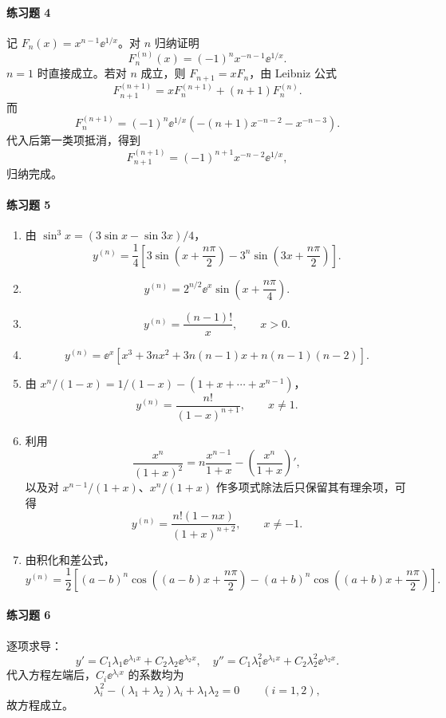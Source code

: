 \paragraph{练习题 4}
\begin{xsolution}
记 $F_n(x)=x^{n-1}\ee^{1/x}$。对 $n$ 归纳证明
\[
  F_n^{(n)}(x)=(-1)^nx^{-n-1}\ee^{1/x}.
\]
$n=1$ 时直接成立。若对 $n$ 成立，则 $F_{n+1}=xF_n$，由 Leibniz 公式
\[
  F_{n+1}^{(n+1)}=xF_n^{(n+1)}+(n+1)F_n^{(n)}.
\]
而
\[
  F_n^{(n+1)}=(-1)^n\ee^{1/x}
  \left(-(n+1)x^{-n-2}-x^{-n-3}\right).
\]
代入后第一类项抵消，得到
\[
  F_{n+1}^{(n+1)}=(-1)^{n+1}x^{-n-2}\ee^{1/x},
\]
归纳完成。
\end{xsolution}

\paragraph{练习题 5}
\begin{xsolution}
\begin{enumerate}[label=(\arabic*)]
  \item 由 $\sin^3x=(3\sin x-\sin3x)/4$，
  \[
    \boxed{y^{(n)}=\frac14\left[3\sin\left(x+\frac{n\pi}{2}\right)-3^n\sin\left(3x+\frac{n\pi}{2}\right)\right]}.
  \]
  \item
  \[
    \boxed{y^{(n)}=2^{n/2}\ee^x\sin\left(x+\frac{n\pi}{4}\right)}.
  \]
  \item
  \[
    \boxed{y^{(n)}=\frac{(n-1)!}{x}},\qquad x>0.
  \]
  \item
  \[
    \boxed{y^{(n)}=\ee^x\left[x^3+3nx^2+3n(n-1)x+n(n-1)(n-2)\right]}.
  \]
  \item 由 $x^n/(1-x)=1/(1-x)-(1+x+\cdots+x^{n-1})$，
  \[
    \boxed{y^{(n)}=\frac{n!}{(1-x)^{n+1}}},\qquad x\ne1.
  \]
  \item 利用
  \[
    \frac{x^n}{(1+x)^2}=n\frac{x^{n-1}}{1+x}-\left(\frac{x^n}{1+x}\right)',
  \]
  以及对 $x^{n-1}/(1+x)$、$x^n/(1+x)$ 作多项式除法后只保留其有理余项，可得
  \[
    \boxed{y^{(n)}=\frac{n!(1-nx)}{(1+x)^{n+2}}},\qquad x\ne-1.
  \]
  \item 由积化和差公式，
  \[
    \boxed{y^{(n)}=\frac12\left[(a-b)^n\cos\left((a-b)x+\frac{n\pi}{2}\right)-(a+b)^n\cos\left((a+b)x+\frac{n\pi}{2}\right)\right]}.
  \]
\end{enumerate}
\end{xsolution}

\paragraph{练习题 6}
\begin{xsolution}
逐项求导：
\[
  y'=C_1\lambda_1\ee^{\lambda_1x}+C_2\lambda_2\ee^{\lambda_2x},
  \quad
  y''=C_1\lambda_1^2\ee^{\lambda_1x}+C_2\lambda_2^2\ee^{\lambda_2x}.
\]
代入方程左端后，$C_i\ee^{\lambda_i x}$ 的系数均为
\[
  \lambda_i^2-(\lambda_1+\lambda_2)\lambda_i+\lambda_1\lambda_2=0
  \qquad(i=1,2),
\]
故方程成立。
\end{xsolution}

